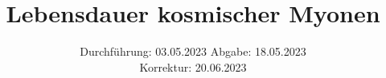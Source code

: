 

\subject{VERSUCH 01}
\title{Lebensdauer kosmischer Myonen}
\date{
  Durchführung: 03.05.2023
  \hspace{3em}
  Abgabe: 18.05.2023 \\
  
  Korrektur: 20.06.2023
}



\maketitle
\thispagestyle{empty}
\tableofcontents
\newpage









\newpage
\printbibliography{}
\nocite{matplotlib}
\nocite{numpy}
\nocite{scipy}
\nocite{uncertainties}
\nocite{reback2020pandas}

\newpage


% 

